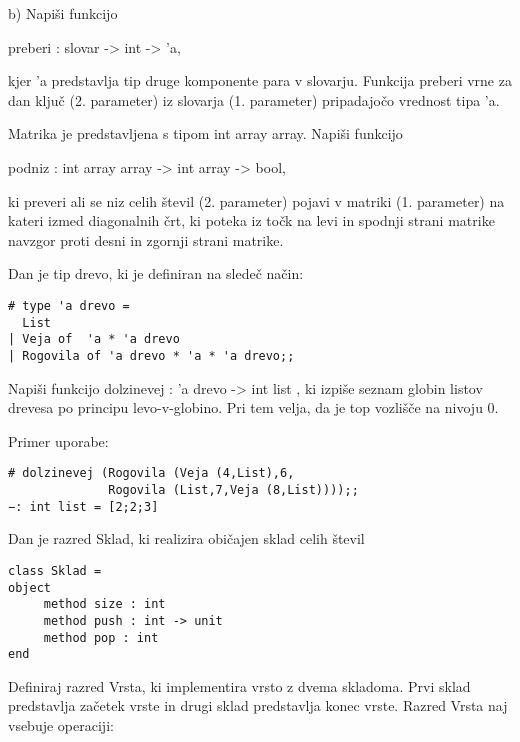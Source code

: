 \begin{ex}
b) Napi\v si funkcijo 

preberi : slovar -> int -> 'a, 

kjer 'a predstavlja tip druge komponente para v slovarju. Funkcija preberi vrne za dan klju\v c (2. parameter) iz slovarja (1. parameter) pripadajo\v co vrednost tipa 'a.


\end{ex} \begin{ex}
Matrika je predstavljena s tipom int array array. Napi\v si funkcijo 

podniz : int array array -> int array -> bool,

ki preveri ali se niz celih \v stevil (2. parameter) pojavi v matriki (1. parameter) na kateri izmed diagonalnih \v crt, ki poteka iz to\v ck na levi in spodnji strani matrike navzgor proti desni in zgornji strani matrike.


\end{ex} \begin{ex}
Dan je tip drevo, ki je definiran na slede\v c na\v cin:

\begin{verbatim}
# type 'a drevo =
  List
| Veja of  'a * 'a drevo
| Rogovila of 'a drevo * 'a * 'a drevo;;

\end{verbatim}
Napi\v si funkcijo dolzinevej : 'a drevo -> int list , ki izpi\v se seznam globin listov drevesa po principu levo-v-globino. Pri tem velja, da je top vozli\v s\v ce na nivoju 0.

Primer uporabe:

\begin{verbatim}
# dolzinevej (Rogovila (Veja (4,List),6,
              Rogovila (List,7,Veja (8,List))));;
−: int list = [2;2;3]

\end{verbatim}

\end{ex} \begin{ex}
Dan je razred Sklad, ki realizira obi\v cajen sklad celih \v stevil

\begin{verbatim}
class Sklad =
object 
     method size : int
     method push : int -> unit
     method pop : int
end

\end{verbatim}
Definiraj razred Vrsta, ki implementira vrsto z dvema skladoma. Prvi sklad predstavlja za\v cetek vrste in drugi sklad predstavlja konec vrste. Razred Vrsta naj vsebuje operaciji: 


\end{ex}
